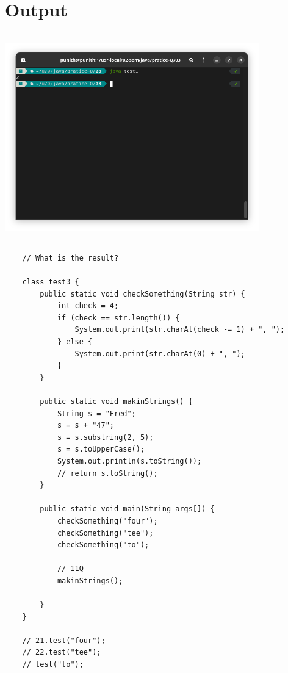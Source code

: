 \documentclass{article}
\begin{document}
 \section*{Output}
 \includegraphics[width=11cm, height=9cm]{./images/05.png}
 \begin{lstlisting}
    // What is the result?

    class test3 {
        public static void checkSomething(String str) {
            int check = 4;
            if (check == str.length()) {
                System.out.print(str.charAt(check -= 1) + ", ");
            } else {
                System.out.print(str.charAt(0) + ", ");
            }
        }
    
        public static void makinStrings() {
            String s = "Fred";
            s = s + "47";
            s = s.substring(2, 5);
            s = s.toUpperCase();
            System.out.println(s.toString());
            // return s.toString();
        }
    
        public static void main(String args[]) {
            checkSomething("four");
            checkSomething("tee");
            checkSomething("to");
    
            // 11Q
            makinStrings();
    
        }
    }
    
    // 21.test("four");
    // 22.test("tee");
    // test("to");
    
 \end{lstlisting}
\end{document}
